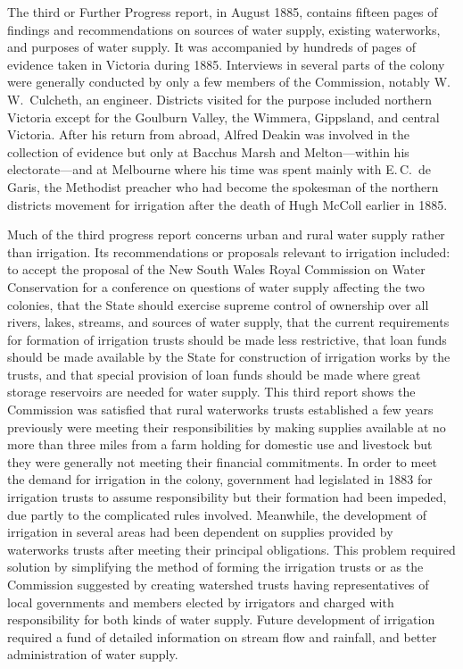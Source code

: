 The third or Further Progress report, in August 1885, contains fifteen
pages of findings and recommendations on sources of water supply,
existing waterworks, and purposes of water supply.  It was accompanied
by hundreds of pages of evidence taken in Victoria during 1885.
Interviews in several parts of the colony were generally conducted by
only a few members of the Commission, notably W.\,W.~Culcheth, an
engineer.  Districts visited for the purpose included northern
Victoria except for the Goulburn Valley, the Wimmera, Gippsland, and
central Victoria.  After his return from abroad, Alfred Deakin was
involved in the collection of evidence but only at Bacchus Marsh and
Melton---within his electorate---and at Melbourne where his time was
spent mainly with E.\,C.~de Garis, the Methodist preacher who had
become the spokesman of the northern districts movement for irrigation
after the death of Hugh McColl earlier in 1885.

Much of the third progress report concerns urban and rural water
supply rather than irrigation.  Its recommendations or proposals
relevant to irrigation included: to accept the proposal of the New
South Wales Royal Commission on Water Conservation for a conference on
questions of water supply affecting the two colonies, that the State
should exercise supreme control of ownership over all rivers, lakes,
streams, and sources of water supply, that the current requirements
for formation of irrigation trusts should be made less restrictive,
that loan funds should be made available by the State for construction
of irrigation works by the trusts, and that special provision of loan
funds should be made where great storage reservoirs are needed for
water supply.  This third report shows the Commission was satisfied
that rural waterworks trusts established a few years previously were
meeting their responsibilities by making supplies available at no more
than three miles from a farm holding for domestic use and livestock
but they were generally not meeting their financial commitments.  In
order to meet the demand for irrigation in the colony, government had
legislated in 1883 for irrigation trusts to assume responsibility but
their formation had been impeded, due partly to the complicated rules
involved.  Meanwhile, the development of irrigation in several areas
had been dependent on supplies provided by waterworks trusts after
meeting their principal obligations.  This problem required solution
by simplifying the method of forming the irrigation trusts or as the
Commission suggested by creating watershed trusts having
representatives of local governments and members elected by irrigators
and charged with responsibility for both kinds of water supply.
Future development of irrigation required a fund of detailed
information on stream flow and rainfall, and better administration of
water supply.

